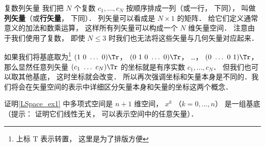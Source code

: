 \begin{exercise}{复数列矢量}
我们把 $N$ 个复数 $c_1, \dots, c_N$ 按顺序排成一列（或一行， 下同）， 叫做\textbf{列矢量}（或\textbf{行矢量}， 下同）． 列矢量可以看成是 $N \times 1$ 的矩阵． 给它们定义通常意义的加法和数乘运算， 这样所有列矢量可以构成一个 $N$ 维矢量空间． 注意由于我们使用了复数， 即使 $N \leqslant 3$ 时我们也无法将这些矢量与几何矢量对应起来．

如果我们将基底取为\footnote{上标 $\mathrm T$ 表示转置， 这里是为了排版方便} $(1\ 0\ \dots\ 0)\Tr$， $(0\ 1\ 0\ \dots\ 0)\Tr$， …， $(0\ \dots\ 0\ 1)\Tr$， 那么显然任意列矢量 $(c_1\ \dots\ c_N)\Tr$ 的坐标就是有序实数 $c_1, \dots, c_N$． 但我们也可以取其他基底， 这时坐标就会改变． 所以再次强调坐标和矢量本身是不同的．我们将会在矢量空间的表示中详细区分矢量本身和矢量的坐标这两个概念．
\end{exercise}

\begin{exercise}{}
证明\autoref{LSpace_ex1} 中多项式空间是 $n+1$ 维空间， $x^k$ （$k = 0, \dots, n$） 是一组基底（提示： 证明它们线性无关， 可以表示空间中的任意矢量）．
\end{exercise}





